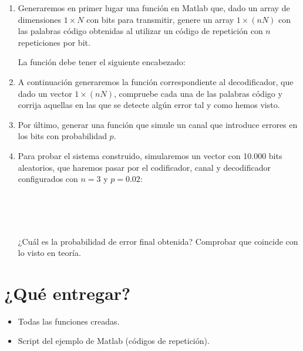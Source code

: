 \documentclass[es,practica]{uah}
\begin{document}
	\begin{enumerate}
	\item \textrm{Generaremos en primer lugar una función en Matlab que, dado un array de dimensiones $1 \times N$ con bits para transmitir, genere un array $1 \times (n N)$ con las palabras código obtenidas al utilizar un código de repetición con $n$ repeticiones por bit.}

		\textrm{La función debe tener el siguiente encabezado:}
		

	\item \textrm{A continuación generaremos la función correspondiente al decodificador, que dado un vector $1 \times (n N)$, compruebe cada una de las palabras código y corrija aquellas en las que se detecte algún error tal y como hemos visto.}
	

	\item \textrm{Por último, generar una función que simule un canal que introduce errores en los bits con probabilidad $p$.} 
	
			
	\item \textrm{Para probar el sistema construido, simularemos un vector con 10.000 bits aleatorios, que haremos pasar por el codificador, canal y decodificador configurados con $n=3$ y $p=0.02$:}
	
 		\\
		\\
		\\
	
		\textrm{¿Cuál es la probabilidad de error final obtenida? Comprobar que coincide con lo visto en teoría. }
	
\end{enumerate}

\section{¿Qué entregar?}
\begin{itemize}
	\item Todas las funciones creadas.
	\item Script del ejemplo de Matlab (códigos de repetición).
\end{itemize}
\end{document}
